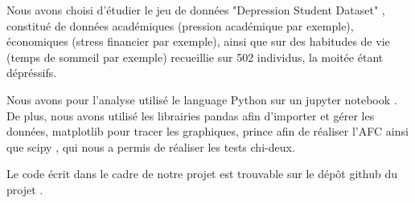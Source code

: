 Nous avons choisi d'étudier le jeu de données "Depression Student Dataset" \citep{dataset}, constitué de données académiques (pression académique par exemple), économiques (stress financier par exemple), ainsi que sur des habitudes de vie (temps de sommeil par exemple) recueillie sur 502 individus, la moitée étant dépréssifs. 

Nous avons pour l'analyse utilisé le language Python \citep{python} sur un jupyter notebook \citep{jupyter}. De plus, nous avons utilisé les librairies pandas \citep{pandas} afin d'importer et gérer les données, matplotlib \citep{matplotlib} pour tracer les graphiques, prince \citep{prince} afin de réaliser l'AFC ainsi que scipy \citep{scipy}, qui nous a permis de réaliser les tests chi-deux.

Le code écrit dans le cadre de notre projet est trouvable sur le dépôt github du projet \citep{repo}.
